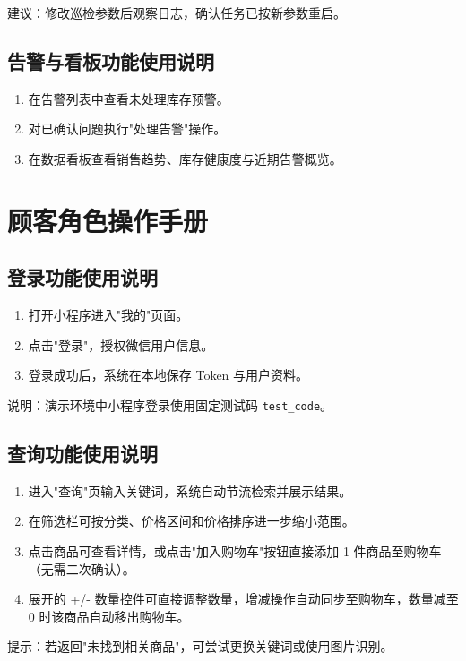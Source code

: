 建议：修改巡检参数后观察日志，确认任务已按新参数重启。

\subsection{告警与看板功能使用说明}
\begin{enumerate}[leftmargin=2em]
  \item 在告警列表中查看未处理库存预警。
  \item 对已确认问题执行"处理告警"操作。
  \item 在数据看板查看销售趋势、库存健康度与近期告警概览。
\end{enumerate}

\section{顾客角色操作手册}

\subsection{登录功能使用说明}
\begin{enumerate}[leftmargin=2em]
  \item 打开小程序进入"我的"页面。
  \item 点击"登录"，授权微信用户信息。
  \item 登录成功后，系统在本地保存 Token 与用户资料。
\end{enumerate}

说明：演示环境中小程序登录使用固定测试码 \texttt{test\_code}。

\subsection{查询功能使用说明}
\begin{enumerate}[leftmargin=2em]
  \item 进入"查询"页输入关键词，系统自动节流检索并展示结果。
  \item 在筛选栏可按分类、价格区间和价格排序进一步缩小范围。
  \item 点击商品可查看详情，或点击"加入购物车"按钮直接添加 1 件商品至购物车（无需二次确认）。
  \item 展开的 +/- 数量控件可直接调整数量，增减操作自动同步至购物车，数量减至 0 时该商品自动移出购物车。
\end{enumerate}

提示：若返回"未找到相关商品"，可尝试更换关键词或使用图片识别。

